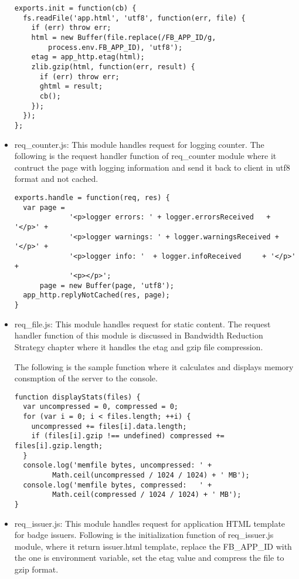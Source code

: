 \begin{itemize}
\begin{lstlisting} 
exports.init = function(cb) {
  fs.readFile('app.html', 'utf8', function(err, file) {
    if (err) throw err;
    html = new Buffer(file.replace(/FB_APP_ID/g,
        process.env.FB_APP_ID), 'utf8');
    etag = app_http.etag(html);
    zlib.gzip(html, function(err, result) {
      if (err) throw err;
      ghtml = result;
      cb();
    });
  });
};
\end{lstlisting} 

\item req{\_}counter.js: This module handles request for logging counter. The following is the request handler function of req{\_}counter module where it contruct the page with logging information and send it back to client in utf8 format and not cached. 

\begin{lstlisting} 
exports.handle = function(req, res) {
  var page =   
             '<p>logger errors: ' + logger.errorsReceived   + '</p>' +
             '<p>logger warnings: ' + logger.warningsReceived + '</p>' +
             '<p>logger info: '  + logger.infoReceived     + '</p>' +
             '<p></p>';
      page = new Buffer(page, 'utf8');
  app_http.replyNotCached(res, page);
}
\end{lstlisting} 

\item req{\_}file.js: This module handles request for static content. The request handler function of this module is discussed in Bandwidth Reduction Strategy chapter where it handles the etag and gzip file compression.

The following is the sample function where it calculates and displays memory consmption of the server to the console.
\begin{lstlisting} 
function displayStats(files) {
  var uncompressed = 0, compressed = 0;
  for (var i = 0; i < files.length; ++i) {
    uncompressed += files[i].data.length;
    if (files[i].gzip !== undefined) compressed += files[i].gzip.length;
  }
  console.log('memfile bytes, uncompressed: ' + 
         Math.ceil(uncompressed / 1024 / 1024) + ' MB');
  console.log('memfile bytes, compressed:   ' + 
         Math.ceil(compressed / 1024 / 1024) + ' MB');
}
\end{lstlisting} 
  
\item req{\_}issuer.js: This module handles request for application HTML template for badge issuers. Following is the initialization function of req{\_}issuer.js module, where it return issuer.html template, replace the FB{\_}APP{\_}ID with the one is environment variable, set the etag value and compress the file to gzip format.


\end{itemize}
